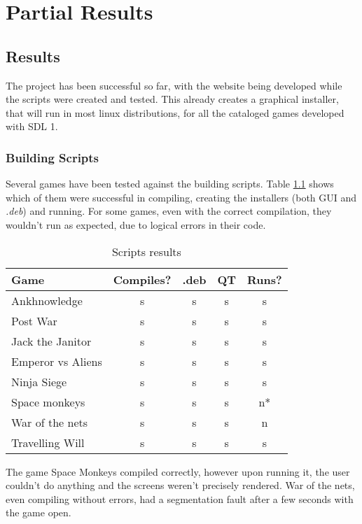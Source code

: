 \chapter[Partial Results]{Partial Results}

\section[Results]{Results}

The project has been successful so far, with the website being developed while the scripts were created and tested. This already creates a graphical installer, that will run in most linux distributions, for all the cataloged games developed with SDL 1.

\subsection[Building Scripts]{Building Scripts}

Several games have been tested against the building scripts. Table \ref{tab:script_games} shows which of them were successful in compiling, creating the installers (both GUI and \textit{.deb}) and running. For some games, even with the correct compilation, they wouldn't run as expected, due to logical errors in their code.

\begin{table}[h!]
\centering
\caption{Scripts results}
\label{tab:script_games}
\begin{tabular}{|l|c|c|c|c|}
\hline
\textbf{Game} & \multicolumn{1}{l|}{\textbf{Compiles?}} & \multicolumn{1}{l|}{\textbf{.deb}} & \multicolumn{1}{l|}{\textbf{QT}} & \multicolumn{1}{l|}{\textbf{Runs?}} \\ \hline
Ankhnowledge & s & s & s & s \\ \hline
Post War & s & s & s & s \\ \hline
Jack the Janitor & s & s & s & s \\ \hline
Emperor vs Aliens & s & s & s & s \\ \hline
Ninja Siege & s & s & s & s \\ \hline
Space monkeys & s & s & s & n* \\ \hline
War of the nets & s & s & s & n \\ \hline
Travelling Will & s & s & s & s \\ \hline
\end{tabular}
\end{table}

The game Space Monkeys compiled correctly, however upon running it, the user couldn't do anything and the screens weren't precisely rendered. War of the nets, even compiling without errors, had a segmentation fault after a few seconds with the game open.

